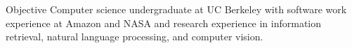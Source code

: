 \begin{rSection}{Objective}
Computer science undergraduate at UC Berkeley with software work experience at Amazon and NASA and research experience in information retrieval, natural language processing, and computer vision.
\end{rSection}